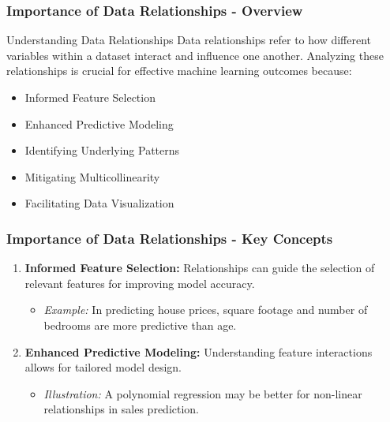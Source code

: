 \documentclass[aspectratio=169]{beamer}
\begin{document}
\begin{frame}[fragile]
    \frametitle{Importance of Data Relationships - Overview}
    \begin{block}{Understanding Data Relationships}
        Data relationships refer to how different variables within a dataset interact and influence one another. Analyzing these relationships is crucial for effective machine learning outcomes because:
    \end{block}
    \begin{itemize}
        \item Informed Feature Selection
        \item Enhanced Predictive Modeling
        \item Identifying Underlying Patterns
        \item Mitigating Multicollinearity
        \item Facilitating Data Visualization
    \end{itemize}
\end{frame}

\begin{frame}[fragile]
    \frametitle{Importance of Data Relationships - Key Concepts}
    \begin{enumerate}
        \item \textbf{Informed Feature Selection:} 
            Relationships can guide the selection of relevant features for improving model accuracy.
            \begin{itemize}
                \item \textit{Example:} In predicting house prices, square footage and number of bedrooms are more predictive than age.
            \end{itemize}
        
        \item \textbf{Enhanced Predictive Modeling:} 
            Understanding feature interactions allows for tailored model design.
            \begin{itemize}
                \item \textit{Illustration:} A polynomial regression may be better for non-linear relationships in sales prediction.
            \end{itemize}
    \end{enumerate}
\end{frame}
\end{document}
